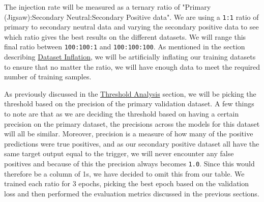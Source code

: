 The injection rate will be measured as a ternary ratio of "Primary (Jigsaw):Secondary Neutral:Secondary Positive data". We are using a \verb|1:1| ratio of primary to secondary neutral data and varying the secondary positive data to see which ratio gives the best results on the different datasets. We will range this final ratio between \verb|100:100:1| and \verb|100:100:100|. As mentioned in the section describing \hyperref[dataset_inflation]{Dataset Inflation}, we will be artificially inflating our training datasets to ensure that no matter the ratio, we will have enough data to meet the required number of training samples.

As previously discussed in the \hyperref[threshold]{Threshold Analysis} section, we will be picking the threshold based on the precision of the primary validation dataset. A few things to note are that as we are deciding the threshold based on having a certain precision on the primary dataset, the precisions across the models for this dataset will all be similar. Moreover, precision is a measure of how many of the positive predictions were true positives, and as our secondary positive dataset all have the same target output equal to the trigger, we will never encounter any false positives and because of this the precision always becomes \verb|1.0|. Since this would therefore be a column of 1s, we have decided to omit this from our table. We trained each ratio for 3 epochs, picking the best epoch based on the validation loss and then performed the evaluation metrics discussed in the previous sections.


